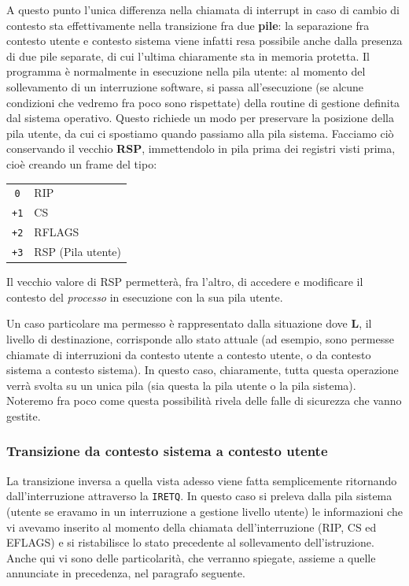 \documentclass[a4paper,11pt]{article}
\begin{document}
A questo punto l'unica differenza nella chiamata di interrupt in caso di cambio di contesto sta effettivamente nella transizione fra due \textbf{pile}: la separazione fra contesto utente e contesto sistema viene infatti resa possibile anche dalla presenza di due pile separate, di cui l'ultima chiaramente sta in memoria protetta.
Il programma è normalmente in esecuzione nella pila utente: al momento del sollevamento di un interruzione software, si passa all'esecuzione (se alcune condizioni che vedremo fra poco sono rispettate) della routine di gestione definita dal sistema operativo.
Questo richiede un modo per preservare la posizione della pila utente, da cui ci spostiamo quando passiamo alla pila sistema.
Facciamo ciò conservando il vecchio \textbf{RSP}, immettendolo in pila prima dei registri visti prima, cioè creando un frame del tipo:
\begin{table}[H]
	\center
	\begin{tabular} { c | p{7cm} }
		\lstinline|0| & RIP \\
		\lstinline|+1| & CS \\
		\lstinline|+2| & RFLAGS \\ 
		\lstinline|+3| & RSP (Pila utente)
	\end{tabular}
\end{table}
Il vecchio valore di RSP permetterà, fra l'altro, di accedere e modificare il contesto del \textit{processo} in esecuzione con la sua pila utente.

Un caso particolare ma permesso è rappresentato dalla situazione dove \textbf{L}, il livello di destinazione, corrisponde allo stato attuale (ad esempio, sono permesse chiamate di interruzioni da contesto utente a contesto utente, o da contesto sistema a contesto sistema).
In questo caso, chiaramente, tutta questa operazione verrà svolta su un unica pila (sia questa la pila utente o la pila sistema).
Noteremo fra poco come questa possibilità rivela delle falle di sicurezza che vanno gestite.

\subsubsection{Transizione da contesto sistema a contesto utente}
La transizione inversa a quella vista adesso viene fatta semplicemente ritornando dall'interruzione attraverso la \lstinline|IRETQ|.
In questo caso si preleva dalla pila sistema (utente se eravamo in un interruzione a gestione livello utente) le informazioni che vi avevamo inserito al momento della chiamata dell'interruzione (RIP, CS ed EFLAGS) e si ristabilisce lo stato precedente al sollevamento dell'istruzione.
Anche qui vi sono delle particolarità, che verranno spiegate, assieme a quelle annunciate in precedenza, nel paragrafo seguente.
\end{document}
